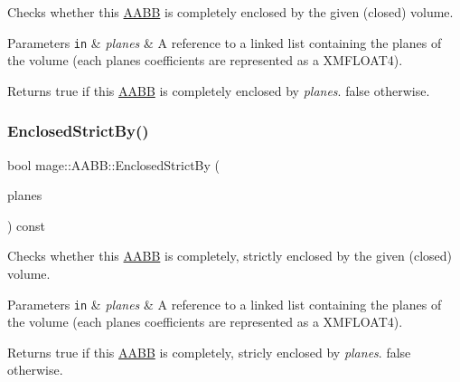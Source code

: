 Checks whether this \hyperlink{structmage_1_1_a_a_b_b}{A\+A\+BB} is completely enclosed by the given (closed) volume.


\begin{DoxyParams}[1]{Parameters}
\mbox{\tt in}  & {\em planes} & A reference to a linked list containing the planes of the volume (each plane\textquotesingle{}s coefficients are represented as a {\ttfamily X\+M\+F\+L\+O\+A\+T4}). \\
\hline
\end{DoxyParams}
\begin{DoxyReturn}{Returns}
{\ttfamily true} if this \hyperlink{structmage_1_1_a_a_b_b}{A\+A\+BB} is completely enclosed by {\itshape planes}. {\ttfamily false} otherwise. 
\end{DoxyReturn}
\hypertarget{structmage_1_1_a_a_b_b_a098cdfecc66ce8a1e557280aafda33e3}{}\label{structmage_1_1_a_a_b_b_a098cdfecc66ce8a1e557280aafda33e3} 
\subsubsection{\texorpdfstring{Enclosed\+Strict\+By()}{EnclosedStrictBy()}}
{\footnotesize\ttfamily bool mage\+::\+A\+A\+B\+B\+::\+Enclosed\+Strict\+By (\begin{DoxyParamCaption}\item[{const list$<$ X\+M\+F\+L\+O\+A\+T4 $>$ \&}]{planes }\end{DoxyParamCaption}) const}

Checks whether this \hyperlink{structmage_1_1_a_a_b_b}{A\+A\+BB} is completely, strictly enclosed by the given (closed) volume.


\begin{DoxyParams}[1]{Parameters}
\mbox{\tt in}  & {\em planes} & A reference to a linked list containing the planes of the volume (each plane\textquotesingle{}s coefficients are represented as a {\ttfamily X\+M\+F\+L\+O\+A\+T4}). \\
\hline
\end{DoxyParams}
\begin{DoxyReturn}{Returns}
{\ttfamily true} if this \hyperlink{structmage_1_1_a_a_b_b}{A\+A\+BB} is completely, stricly enclosed by {\itshape planes}. {\ttfamily false} otherwise. 
\end{DoxyReturn}
\hypertarget{structmage_1_1_a_a_b_b_a0d6619404376bacf956b4a0c6662696f}{}\label{structmage_1_1_a_a_b_b_a0d6619404376bacf956b4a0c6662696f} 
